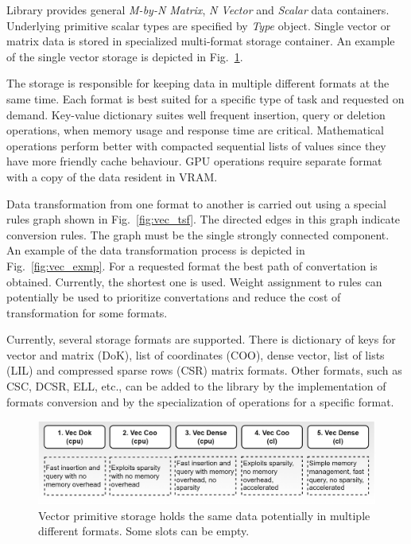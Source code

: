 Library provides general \textit{M-by-N Matrix}, \textit{N Vector} and \textit{Scalar} data containers.
Underlying primitive scalar types are specified by \textit{Type} object. 
Single vector or matrix data is stored in specialized multi-format storage container. An example of the single vector storage is depicted in Fig.~\ref{fig:vec_storage}. 

The storage is responsible for keeping data in multiple different formats at the same time. 
Each format is best suited for a specific type of task and requested on demand. 
Key-value dictionary suites well frequent insertion, query or deletion operations, when memory usage and response time are critical. 
Mathematical operations perform better with compacted sequential lists of values since they have more friendly cache behaviour. 
GPU operations require separate format with a copy of the data resident in VRAM.

Data transformation from one format to another is carried out using a special rules graph shown in Fig.~\ref{fig:vec_tsf}. 
The directed edges in this graph indicate conversion rules. 
The graph must be the single strongly connected component. 
An example of the data transformation process is depicted in Fig.~\ref{fig:vec_exmp}. 
For a requested format the best path of convertation is obtained. Currently, the shortest one is used. 
Weight assignment to rules can potentially be used to prioritize convertations and reduce the cost of transformation for some formats. 

Currently, several storage formats are supported. 
There is dictionary of keys for vector and matrix (DoK), list of coordinates (COO), dense vector, list of lists (LIL) and compressed sparse rows (CSR) matrix formats.  
Other formats, such as CSC, DCSR, ELL, etc., can be added to the library by the implementation of formats conversion and by the specialization of operations for a specific format.

\begin{figure}[b]
\centering
\includegraphics[width=0.9\linewidth]{figures/vector_storage.png}
\caption{Vector primitive storage holds the same data potentially in multiple different formats. Some slots can be empty.}
\label{fig:vec_storage}
\end{figure}

